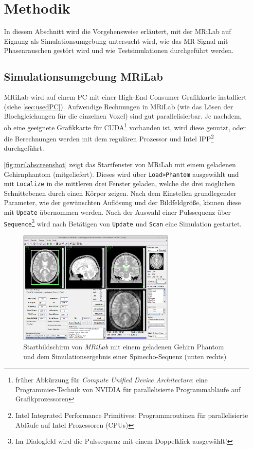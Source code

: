 \chapter{Methodik}
In diesem Abschnitt wird die Vorgehensweise erläutert, mit der MRiLab auf Eignung als Simulationsumgebung untersucht wird, wie das MR-Signal mit Phasenrauschen gestört wird und wie Testsimulationen durchgeführt werden.

\section{Simulationsumgebung MRiLab}
MRiLab wird auf einem PC mit einer High-End Consumer Grafikkarte installiert (siehe \autoref{sec:usedPC}). Aufwendige Rechnungen in MRiLab (wie das Lösen der Blochgleichungen für die einzelnen Voxel) sind gut parallelisierbar. Je nachdem, ob eine geeignete Grafikkarte für CUDA\footnote{früher Abkürzung für \textit{Compute Unified Device Architecture}: eine Programmier-Technik von NVIDIA für parallelisierte Programmabläufe auf Grafikprozessoren} vorhanden ist, wird diese genutzt, oder die Berechnungen werden mit dem regulären Prozessor und Intel IPP\footnote{Intel Integrated Performance Primitives: Programmroutinen für parallelisierte Abläufe auf Intel Prozessoren (CPUs)} durchgeführt.

\autoref{fig:mrilabscreenshot} zeigt das Startfenster von MRiLab mit einem geladenen Gehirnphantom (mitgeliefert). Dieses wird über \texttt{Load>Phantom} ausgewählt und mit \texttt{Localize} in die mittleren drei Fenster geladen, welche die drei möglichen Schnittebenen durch einen Körper zeigen. Nach dem Einstellen grundlegender Parameter, wie der gewünschten Auflösung und der Bildfeldgröße, können diese mit \texttt{Update} übernommen werden. Nach der Auswahl einer Pulssequenz über \texttt{Sequence}\footnote{Im Dialogfeld wird die Pulssequenz mit einem Doppelklick ausgewählt!} wird nach Betätigen von \texttt{Update} und \texttt{Scan} eine Simulation gestartet.

\begin{figure}[H]
	\centering
	\includegraphics[width=0.7\textwidth]{img/mrilabScreenshot.png}
	\caption[MRiLab Startbildschirm]{Startbildschirm von \textit{MRiLab} mit einem geladenen Gehirn Phantom und dem Simulationsergebnis einer Spinecho-Sequenz (unten rechts)}
	\label{fig:mrilabscreenshot}
\end{figure}

